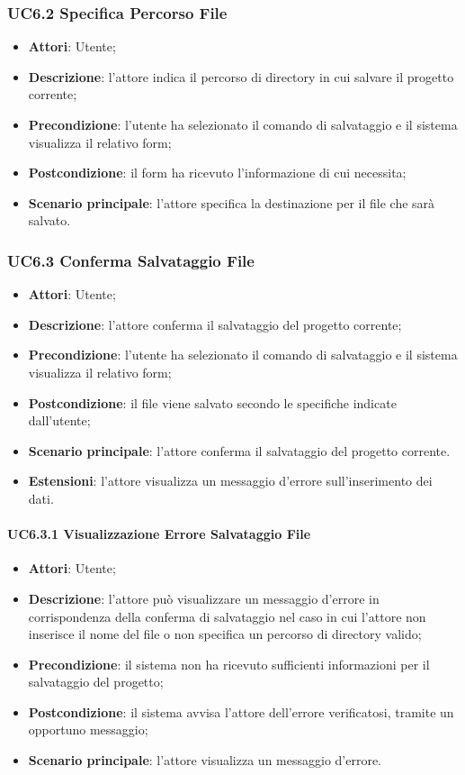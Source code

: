 \subsubsection{UC6.2 Specifica Percorso File}
\label{UC6.2}
\begin{itemize}
	\item \textbf{Attori}: Utente;
	\item \textbf{Descrizione}: l'attore indica il percorso di directory in cui salvare il progetto corrente;
	\item \textbf{Precondizione}: l'utente ha selezionato il comando di salvataggio e il sistema visualizza il relativo form;
	\item \textbf{Postcondizione}: il form ha ricevuto l'informazione di cui necessita;
	\item \textbf{Scenario principale}: l'attore specifica la destinazione per il file che sarà salvato.
\end{itemize}

\subsubsection{UC6.3 Conferma Salvataggio File}
\label{UC6.3}
\begin{itemize}
	\item \textbf{Attori}: Utente;
	\item \textbf{Descrizione}: l'attore conferma il salvataggio del progetto corrente;
	\item \textbf{Precondizione}: l'utente ha selezionato il comando di salvataggio e il sistema visualizza il relativo form;
	\item \textbf{Postcondizione}: il file viene salvato secondo le specifiche indicate dall'utente;
	\item \textbf{Scenario principale}: l'attore conferma il salvataggio del progetto corrente.
	\item \textbf{Estensioni}: l'attore visualizza un messaggio d'errore sull'inserimento dei dati.
\end{itemize}

\paragraph{UC6.3.1 Visualizzazione Errore Salvataggio File}
\begin{itemize}
	\item \textbf{Attori}: Utente;
	\item \textbf{Descrizione}: l'attore può visualizzare un messaggio d'errore in corrispondenza della conferma di salvataggio nel caso in cui l'attore non inserisce il nome del file o non specifica un percorso di directory valido;
	\item \textbf{Precondizione}: il sistema non ha ricevuto sufficienti informazioni per il salvataggio del progetto;
	\item \textbf{Postcondizione}: il sistema avvisa l'attore dell'errore verificatosi, tramite un opportuno messaggio;
	\item \textbf{Scenario principale}: l'attore visualizza un messaggio d'errore.
\end{itemize}

